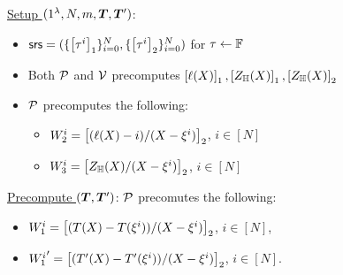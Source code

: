 \begin{figure}[t!]
    \begin{mdframed}
		
		\underline{Setup $(1^\secp,N,m, \vecT, \vecT')$}: 
		\begin{itemize}[leftmargin=1em]
			\item $\mathsf{srs} = (\{\left[{\tau^i}\right]_1\}_{i=0}^N, \{\left[{\tau^i}\right]_2\}_{i=0}^N)$ for $\tau\gets \mathbb{F}$
			\item Both $\mathcal{P}$ and $\mathcal{V}$ precomputes $\left[{\ell(X)}\right]_1, \left[{Z_\mathbb{H}(X)}\right]_1, \left[{Z_\mathbb{H}(X)}\right]_2$
			\item $\mathcal{P}$ precomputes the following:
			\begin{itemize}[leftmargin=1em]
				\item $W_2^i=\left[{(\ell(X) - i)/(X-\xi^i)}\right]_2$, $i\in [N]$
				\item $W_3^i=\left[{Z_\mathbb{H}(X)/(X-\xi^i)}\right]_2$, $i\in [N]$
			\end{itemize}
		\end{itemize}
		
		
		\underline{Precompute $(\vecT, \vecT')$}: $\mathcal{P}$ precomutes the following:
		\begin{itemize}[leftmargin=1em]
				\item $W_1^i=\left[{(T(X)-T(\xi^i))/(X-\xi^i)}\right]_2$, $i\in [N]$,
				\item ${W_1^i}'=\left[{(T'(X) - T'(\xi^i))/(X-\xi^i)}\right]_2$, $i\in [N]$.
		\end{itemize}
		
		
		
%


\end{mdframed}
\end{figure}
